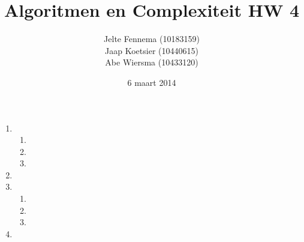 \documentclass[11pt]{article}
\title{\textbf{Algoritmen en Complexiteit HW 4}}
\author{Jelte Fennema (10183159)\\
		Jaap Koetsier (10440615)\\
        Abe Wiersma (10433120)}
\date{6 maart 2014}
\begin{document}
\maketitle

\begin{enumerate}
    \item
        \begin{enumerate}
            \item

            \item

            \item
            
        \end{enumerate}

    \item

    \item
        \begin{enumerate}
            \item

            \item

            \item

        \end{enumerate}

    \item

\end{enumerate}
\end{document}
